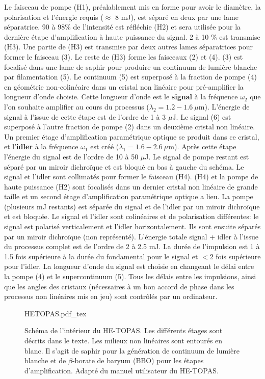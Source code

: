Le faisceau de pompe (H1), préalablement mis en forme pour avoir le diamètre, la polarisation et l'énergie requis ($\approx$ 8 mJ), est séparé en deux par une lame séparatrice. 90 à 98\% de l'intensité est réfléchie (H2) et sera utilisée pour la dernière étape d'amplification à haute puissance du signal. 2 à 10 \% est transmise (H3). Une partie de (H3) est transmise par deux autres lames séparatrices pour former le faisceau (3). Le reste de (H3) forme les faisceaux (2) et (4). (3) est focalisé dans une lame de saphir pour produire un continuum de lumière blanche par filamentation (5). Le continuum (5) est superposé à la fraction de pompe (4) en géométrie non-colinéaire dans un cristal non linéaire pour pré-amplifier la longueur d'onde choisie. Cette longueur d'onde est le \textbf{signal} à la fréquence $\omega_2$ que l'on souhaite amplifier au cours du processus ($\lambda_2 = 1.2 - 1.6 \: \mu$m). L'énergie de signal à l'issue de cette étape est de l'ordre de 1 à 3 $\mu$J. Le signal (6) est superposé à l'autre fraction de pompe (2) dans un deuxième cristal non linéaire. Un premier étage d'amplification paramétrique optique se produit dans ce cristal, et l'\textbf{idler} à la fréquence $\omega_1$ est créé ($\lambda_1 = 1.6 - 2.6 \: \mu$m). Après cette étape l'énergie du signal est de l'ordre de 10 à 50 $\mu$J. Le signal de pompe restant est séparé par un miroir dichroïque et est bloqué en bas à gauche du schéma. Le signal et l'idler sont collimatés pour former le faisceau (H4). (H4) et la pompe de haute puissance (H2) sont focalisés dans un dernier cristal non linéaire de grande taille et un second étage d'amplification paramétrique optique a lieu. La pompe (plusieurs mJ restants) est séparée du signal et de l'idler par un miroir dichroïque et est bloquée. Le signal et l'idler sont colinéaires et de polarisation différentes: le signal est polarisé verticalement et l'idler horizontalement. Ils sont ensuite séparés par un miroir dichroïque (non représenté). L'énergie totale signal + idler à l'issue du processus complet est de l'ordre de 2 à 2.5 mJ. La durée de l'impulsion est 1 à 1.5 fois supérieure à la durée du fondamental pour le signal et $< 2$ fois supérieure pour l'idler. La longueur d'onde du signal est choisie en changeant le délai entre la pompe (4) et le supercontinuum (5). Tous les délais entre les impulsions, ainsi que les angles des cristaux (nécessaires à un bon accord de phase dans les processus non linéaires mis en jeu) sont contrôlés par un ordinateur.

\begin{figure}
\centering
\def\svgwidth{\columnwidth}
{HETOPAS.pdf_tex}
\caption{Schéma de l'intérieur du HE-TOPAS. Les différents étages sont décrits dans le texte. Les milieux non linéaires sont entourés en blanc. Il s'agit de saphir pour la génération de continuum de lumière blanche et de $\beta$-borate de baryum (BBO) pour les étapes d'amplification. Adapté du manuel utilisateur du HE-TOPAS.}
\label{fig:HETOPAS}
\end{figure}


